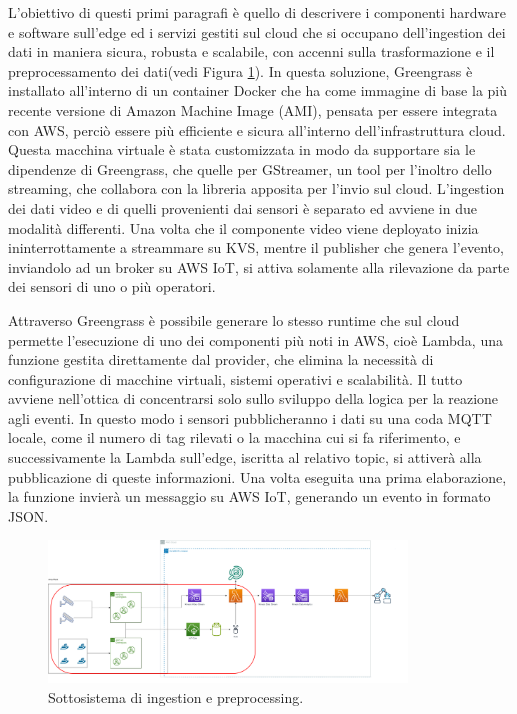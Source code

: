 L'obiettivo di questi primi paragrafi è quello di descrivere i componenti hardware e software sull’edge ed i servizi gestiti sul cloud che si occupano dell’ingestion dei dati in maniera sicura, robusta e scalabile, con accenni sulla trasformazione e il preprocessamento dei dati(vedi Figura \ref{fig:sub-ing}). In questa soluzione, Greengrass è installato all’interno di un container Docker che ha come immagine di base la più recente versione di Amazon Machine Image (AMI), pensata per essere integrata con AWS, perciò essere più efficiente e sicura all’interno dell’infrastruttura cloud. Questa macchina virtuale è stata customizzata in modo da supportare sia le dipendenze di Greengrass, che quelle per GStreamer, un tool per l’inoltro dello streaming, che collabora con la libreria apposita per l'invio sul cloud. L’ingestion dei dati video e di quelli provenienti dai sensori è separato ed avviene in due modalità differenti. Una volta che il componente video viene deployato inizia ininterrottamente a streammare su KVS, mentre il publisher che genera l’evento, inviandolo ad un broker su AWS IoT, si attiva solamente alla rilevazione da parte dei sensori di uno o più operatori. 

Attraverso Greengrass è possibile generare lo stesso runtime che sul cloud permette l’esecuzione di uno dei componenti più noti in AWS, cioè Lambda, una funzione gestita direttamente dal provider, che elimina la necessità di configurazione di macchine virtuali, sistemi operativi e scalabilità. Il tutto avviene nell’ottica di concentrarsi solo sullo sviluppo della logica per la reazione agli eventi. In questo modo i sensori pubblicheranno i dati su una coda MQTT locale, come il numero di tag rilevati o la macchina cui si fa riferimento, e successivamente la Lambda sull'edge, iscritta al relativo topic, si attiverà alla pubblicazione di queste informazioni. Una volta eseguita una prima elaborazione, la funzione invierà un messaggio su AWS IoT, generando un evento in formato JSON. 

\begin{figure}[htbp]
    \centering
    \includegraphics[width=0.85\textwidth]{figures/sottosistema-ingestion.png}
    \caption{Sottosistema di ingestion e preprocessing.} 
    \label{fig:sub-ing}
\end{figure}

